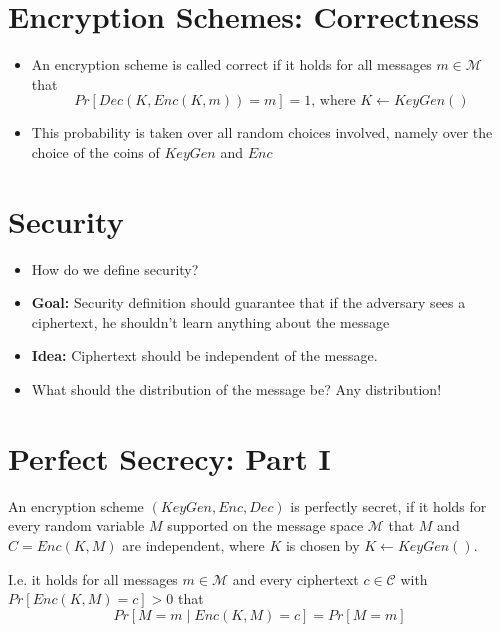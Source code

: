 	\section{Encryption Schemes: Correctness}
		\begin{itemize}
			\item An encryption scheme is called correct if it holds for all messages $m \in \mathcal{M}$ that
				$$Pr[Dec(K,Enc(K,m)) = m] = 1 \text{, where } K \leftarrow KeyGen()$$
			\item This probability is taken over all random choices involved, namely over the choice of the coins of $KeyGen$ and $Enc$
		\end{itemize}
	
	\section{Security}
		\begin{itemize}
			\item How do we define security?
			\item \textbf{Goal:} Security definition should guarantee that if the adversary sees a ciphertext, he shouldn't learn anything about the message
			\item \textbf{Idea:} Ciphertext should be independent of the message.
			\item What should the distribution of the message be? Any distribution!
		\end{itemize}
    
    
    
    \section{Perfect Secrecy: Part I}
	    \begin{definition}\label{Def.PerfectSecrecy1}
    		An encryption scheme $(KeyGen,Enc,Dec)$ is perfectly secret, if it holds for every random variable $M$ supported on the message space $\mathcal{M}$ that $M$ 
    		and $C=Enc(K,M)$ are independent, where $K$ is chosen by $K \leftarrow KeyGen()$.\newline
    	
		    I.e. it holds for all messages $m \in \mathcal{M}$ and every ciphertext $c \in \mathcal{C}$ with\\
		    $Pr[Enc(K,M)=c] > 0$ that
    		$$Pr[M=m \mid Enc(K,M) = c] = Pr[M=m]$$
   		 \end{definition}
   		 
